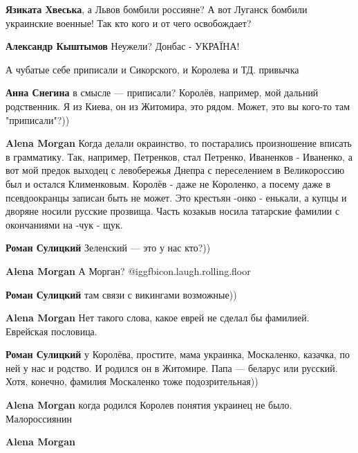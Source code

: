 \begin{itemize}
\begin{itemize}
\textbf{Язиката Хвеська}, а Львов бомбили россияне? А вот Луганск бомбили украинские военные! Так кто кого и от чего освобождает?

\textbf{Александр Кыштымов} Неужели? Донбас - УКРАЇНА!

\end{itemize} %


А чубатые себе приписали и Сикорского, и Королева и ТД. привычка

\begin{itemize} %
\textbf{Анна Снегина} в смысле — приписали? Королёв, например, мой дальний родственник. Я из Киева, он из Житомира, это рядом. Может, это вы кого-то там "приписали"?))

\textbf{Alena Morgan} Когда делали окраинство, то постарались произношение вписать в грамматику. Так, например, Петренков, стал Петренко, Иваненков - Иваненко, а вот мой предок выходец с левобережья Днепра с переселением в Великороссию был и остался Клименковым. Королёв - даже не Короленко, а посему даже в псевдоокранцы записан быть не может. Это крестьян -онко - енькали, а купцы и дворяне носили русские прозвища. Часть козакыв носила татарские фамилии с окончаниями на -чук - щук.

\textbf{Роман Сулицкий} Зеленский — это у нас кто?))

\textbf{Alena Morgan} А Морган?  @igg{fbicon.laugh.rolling.floor} 

\textbf{Роман Сулицкий} там связи с викингами возможные))

\textbf{Alena Morgan} Нет такого слова, какое еврей не сделал бы фамилией. Еврейская пословица.

\textbf{Роман Сулицкий} у Королёва, простите, мама украинка, Москаленко, казачка, по ней у нас и родство. И родился он в Житомире. Папа — беларус или русский. Хотя, конечно, фамилия Москаленко тоже подозрительная))

\textbf{Alena Morgan} когда родился Королев понятия украинец не было. Малороссиянин

\textbf{Alena Morgan} 


\end{itemize}
\end{itemize}
